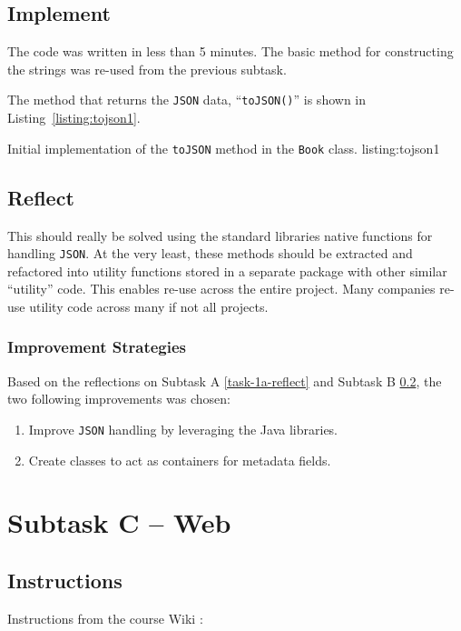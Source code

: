 \subsection{Implement}\label{task-1b-implement}
The code was written in less than 5 minutes. The basic method for
constructing the strings was re-used from the previous subtask.

The method that returns the \texttt{JSON} data, ``\texttt{toJSON()}'' is shown
in Listing~\ref{listing:tojson1}.

           {Initial implementation of the \texttt{toJSON\(\)} method in the
            \texttt{Book} class.}
           {listing:tojson1}


\subsection{Reflect}\label{task-1b-reflect}
This should really be solved using the standard libraries native functions for
handling \texttt{JSON}. 
At the very least, these methods should be extracted and refactored into
utility functions stored in a separate package with other similar ``utility''
code.  This enables re-use across the entire project. Many companies re-use
utility code across many if not all projects.


\subsubsection{Improvement Strategies}
Based on the reflections on Subtask A \ref{task-1a-reflect} and Subtask B
\ref{task-1b-reflect}, the two following improvements was chosen:

\begin{enumerate}
  \item Improve \texttt{JSON} handling by leveraging the Java libraries.
  \item Create classes to act as containers for metadata fields.
\end{enumerate}



\section{Subtask C -- Web}\label{subtask-c-web}
\subsection{Instructions}\label{task-1-instructions}
Instructions from the course Wiki \cite{1dv600:lab1:instructions}:

